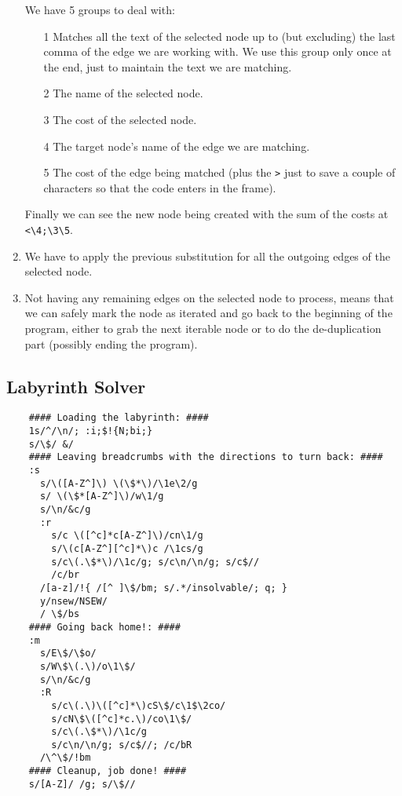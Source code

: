 \begin{enumerate}
		We have 5 groups to deal with:
		\begin{enumerate}
			\item[1] Matches all the text of the selected node up to (but
				excluding) the last comma of the edge we are working with.
				We use this group only once at the end, just to maintain the
				text we are matching.
			\item[2] The name of the selected node.
			\item[3] The cost of the selected node.
			\item[4] The target node's name of the edge we are matching.
			\item[5] The cost of the edge being matched (plus the \verb|>|
				just to save a couple of characters so that the code enters
				in the frame).
		\end{enumerate}

		Finally we can see the new node being created with the sum of the costs
		at \verb|<\4;\3\5|.

	\item We have to apply the previous substitution for all the outgoing
		edges of the selected node.
	\item Not having any remaining edges on the selected node to process, means
		that we can safely mark the node as iterated and go back to the
		beginning of the program, either to grab the next iterable node or
		to do the de-duplication part (possibly ending the program).
\end{enumerate}

\subsection{Labyrinth Solver}


\begin{Verbatim}
	#### Loading the labyrinth: ####
	1s/^/\n/; :i;$!{N;bi;}
	s/\$/ &/
	#### Leaving breadcrumbs with the directions to turn back: ####
	:s
	  s/\([A-Z^]\) \(\$*\)/\1e\2/g
	  s/ \(\$*[A-Z^]\)/w\1/g
	  s/\n/&c/g
	  :r
	    s/c \([^c]*c[A-Z^]\)/cn\1/g
	    s/\(c[A-Z^][^c]*\)c /\1cs/g
	    s/c\(.\$*\)/\1c/g; s/c\n/\n/g; s/c$//
	    /c/br
	  /[a-z]/!{ /[^ ]\$/bm; s/.*/insolvable/; q; }
	  y/nsew/NSEW/
	  / \$/bs
	#### Going back home!: ####
	:m
	  s/E\$/\$o/
	  s/W\$\(.\)/o\1\$/
	  s/\n/&c/g
	  :R
	    s/c\(.\)\([^c]*\)cS\$/c\1$\2co/
	    s/cN\$\([^c]*c.\)/co\1\$/
	    s/c\(.\$*\)/\1c/g
	    s/c\n/\n/g; s/c$//; /c/bR
	  /\^\$/!bm
	#### Cleanup, job done! ####
	s/[A-Z]/ /g; s/\$//
\end{Verbatim}


